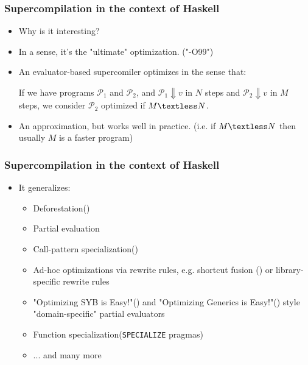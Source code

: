 \documentclass{beamer}
\begin{document}
\begin{frame}
    \frametitle{Supercompilation in the context of Haskell}

    \begin{itemize}
        \item
            Why is it interesting?
        \item
            In a sense, it's the "ultimate" optimization. ("-O99")
        \item
            An evaluator-based supercomiler optimizes in the sense that:

            If we have programs $\mathcal{P}_1$ and $\mathcal{P}_2$, and
            \newline
            $\mathcal{P}_1 \Downarrow v$ in $N$ steps and \newline
            $\mathcal{P}_2 \Downarrow v$ in $M$ steps, \newline
            we consider $\mathcal{P}_2$ optimized if $M \textless N$.
        \item
            An approximation, but works well in practice.
            \newline
            (i.e. if $M \textless N$ then usually $M$ is a faster program)
    \end{itemize}
\end{frame}


\begin{frame}
    \frametitle{Supercompilation in the context of Haskell}

    \begin{itemize}
        \item[]
            It generalizes:
            \begin{itemize}
                \item
                    Deforestation(\citet{deforestation})
                \item
                    Partial evaluation
                \item
                    Call-pattern specialization(\citet{callpatternspec})
                \item
                    Ad-hoc optimizations via rewrite rules, e.g. shortcut fusion
                    (\citet{shortcutdeforestation}) or library-specific rewrite
                    rules
                \item
                    "Optimizing SYB is Easy!"(\citet{optimizingsyb}) and
                    "Optimizing Generics is Easy!"(\citet{optimizinggenerics})
                    style "domain-specific" partial evaluators
                \item
                    Function specialization(\texttt{SPECIALIZE} pragmas)
                \item
                    ... and many more
            \end{itemize}
    \end{itemize}
\end{frame}
\end{document}
